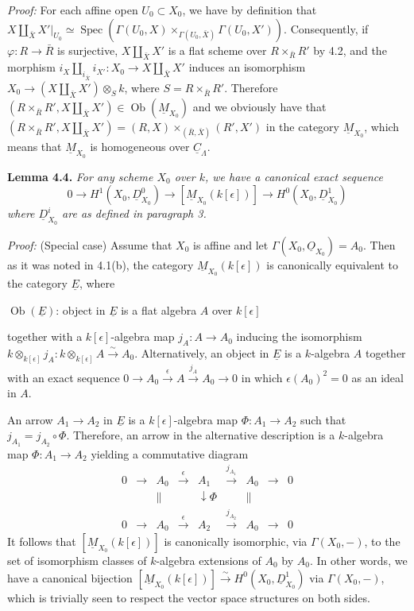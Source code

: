 \documentclass[11pt]{article}
\theoremstyle{plain}
\theoremstyle{definition}
\theoremstyle{remark}
\DeclareMathOperator{\Spec}{Spec}
\DeclareMathOperator{\ob}{Ob}
\begin{document}
\medskip
\noindent\textit{Proof:} For each affine open $U_0 \subset X_0$, we have by definition that $X \amalg_{\bar{X}} X'|_{U_0} \simeq \Spec(\Gamma(U_0, X) \times_{\Gamma(U_0,\bar{X})} \Gamma(U_0, X'))$. Consequently, if $\varphi : R \to \bar{R}$ is surjective, $X \amalg_{\bar{X}} X'$ is a flat scheme over $R \times_{\bar{R}} R'$ by 4.2, and the morphism $i_X \amalg_{i_{\bar{X}}} i_{X'} : X_0 \to X \amalg_{\bar{X}} X'$ induces an isomorphism $X_0 \to (X \amalg_{\bar{X}} X') \otimes_S k$, where $S = R \times_{\bar{R}} R'$. Therefore $(R \times_{\bar{R}} R', X \amalg_{\bar{X}} X') \in \ob(\underline{M}_{X_0})$ and we obviously have that $(R \times_{\bar{R}} R', X \amalg_{\bar{X}} X') = (R, X) \times_{(\bar{R},\bar{X})} (R', X')$ in the category $\underline{M}_{X_0}$, which means that $\underline{M}_{X_0}$ is homogeneous over $\underline{C}_\Lambda$.

\medskip
\noindent\textbf{Lemma 4.4.} \textit{For any scheme $X_0$ over $k$, we have a canonical exact sequence}
\[0 \to H^1(X_0, \underline{D}_{X_0}^0) \to [\underline{M}_{X_0}(k[\epsilon])] \to H^0(X_0, \underline{D}_{X_0}^1)\]
\textit{where $\underline{D}_{X_0}^i$ are as defined in paragraph 3.}

\medskip
\noindent\textit{Proof:} (Special case) Assume that $X_0$ is affine and let $\Gamma(X_0, \underline{O}_{X_0}) = A_0$. Then as it was noted in 4.1(b), the category $\underline{M}_{X_0}(k[\epsilon])$ is canonically equivalent to the category $\underline{E}$, where

$\ob(\underline{E})$: object in $\underline{E}$ is a flat algebra $A$ over $k[\epsilon]$

together with a $k[\epsilon]$-algebra map $j_A : A \to A_0$ inducing the isomorphism $k \otimes_{k[\epsilon]} j_A : k \otimes_{k[\epsilon]} A \xrightarrow{\sim} A_0$. Alternatively, an object in $\underline{E}$ is a $k$-algebra $A$ together with an exact sequence $0 \to A_0 \xrightarrow{\epsilon} A \xrightarrow{j_A} A_0 \to 0$ in which $\epsilon(A_0)^2 = 0$ as an ideal in $A$.

An arrow $A_1 \to A_2$ in $\underline{E}$ is a $k[\epsilon]$-algebra map $\Phi : A_1 \to A_2$ such that $j_{A_1} = j_{A_2} \circ \Phi$. Therefore, an arrow in the alternative description is a $k$-algebra map $\Phi : A_1 \to A_2$ yielding a commutative diagram
\[
\begin{array}{ccccccccc}
0 & \longrightarrow & A_0 & \xrightarrow{\epsilon} & A_1 & \xrightarrow{j_{A_1}} & A_0 & \longrightarrow & 0 \\
& & \parallel & & \downarrow\scriptstyle{\Phi} & & \parallel & & \\
0 & \longrightarrow & A_0 & \xrightarrow{\epsilon} & A_2 & \xrightarrow{j_{A_2}} & A_0 & \longrightarrow & 0
\end{array}
\]
It follows that $[\underline{M}_{X_0}(k[\epsilon])]$ is canonically isomorphic, via $\Gamma(X_0, -)$, to the set of isomorphism classes of $k$-algebra extensions of $A_0$ by $A_0$. In other words, we have a canonical bijection $[\underline{M}_{X_0}(k[\epsilon])] \xrightarrow{\sim} H^0(X_0, \underline{D}_{X_0}^1)$ via $\Gamma(X_0, -)$, which is trivially seen to respect the vector space structures on both sides.
\end{document}
